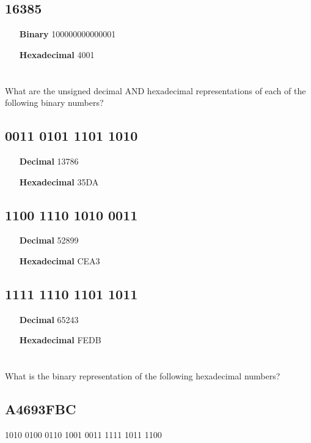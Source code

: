 \documentclass{article}
\begin{document}
\subsection{16385}
\begin{itemize}
	\item[\textbf{Binary}] 100000000000001
	\item[\textbf{Hexadecimal}] 4001
\end{itemize}

\section{}
What are the unsigned decimal AND hexadecimal representations of each of the following binary numbers?

\subsection{0011 0101 1101 1010}
\begin{itemize}
	\item[\textbf{Decimal}] 13786
	\item[\textbf{Hexadecimal}] 35DA
\end{itemize}

\subsection{1100 1110 1010 0011}
\begin{itemize}
	\item[\textbf{Decimal}] 52899
	\item[\textbf{Hexadecimal}] CEA3
\end{itemize}

\subsection{1111 1110 1101 1011}
\begin{itemize}
	\item[\textbf{Decimal}] 65243
	\item[\textbf{Hexadecimal}] FEDB
\end{itemize}

\section{}
What is the binary representation of the following hexadecimal numbers?

\subsection{A4693FBC}
1010 0100 0110 1001 0011 1111 1011 1100
\end{document}
